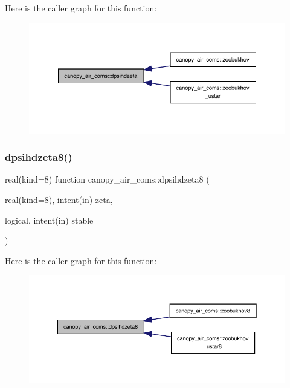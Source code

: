 Here is the caller graph for this function\+:
\nopagebreak
\begin{figure}[H]
\begin{center}
\leavevmode
\includegraphics[width=348pt]{namespacecanopy__air__coms_a64552e0380fcb36366b5eb0f624241a3_icgraph}
\end{center}
\end{figure}
\mbox{\label{namespacecanopy__air__coms_aa5f9649efc40a05ddc13e1450f30fad3}} 
\subsubsection{\texorpdfstring{dpsihdzeta8()}{dpsihdzeta8()}}
{\footnotesize\ttfamily real(kind=8) function canopy\+\_\+air\+\_\+coms\+::dpsihdzeta8 (\begin{DoxyParamCaption}\item[{real(kind=8), intent(in)}]{zeta,  }\item[{logical, intent(in)}]{stable }\end{DoxyParamCaption})}

Here is the caller graph for this function\+:
\nopagebreak
\begin{figure}[H]
\begin{center}
\leavevmode
\includegraphics[width=350pt]{namespacecanopy__air__coms_aa5f9649efc40a05ddc13e1450f30fad3_icgraph}
\end{center}
\end{figure}
\mbox{\label{namespacecanopy__air__coms_af8bc6f1d6999a4b614461cecb85c9b1b}} 
